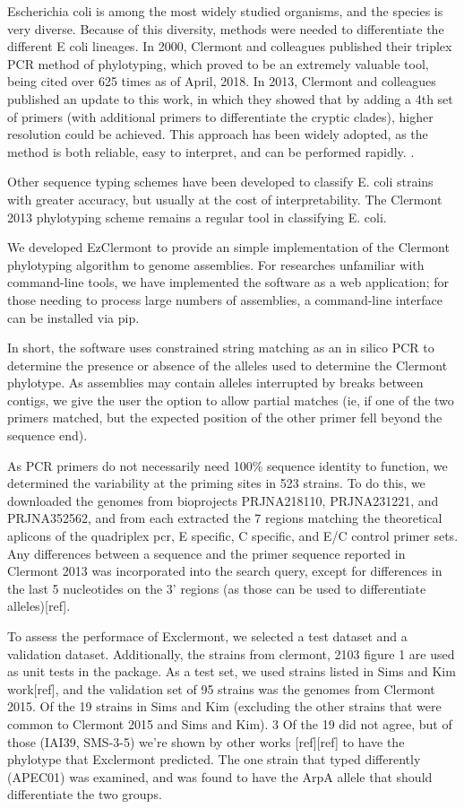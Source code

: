Escherichia coli is among the most widely studied organisms, and the species is very diverse.  Because of this diversity, methods were needed to differentiate the different  E coli lineages.  In 2000, Clermont and colleagues published their triplex PCR method of phylotyping, which proved to be an extremely valuable tool, being cited over 625 times as of April, 2018.  In 2013, Clermont and colleagues published an update to this work, in which they showed that by adding a 4th set of primers (with additional primers to differentiate the cryptic clades), higher resolution could be achieved.  This approach has been widely adopted, as the method is both reliable, easy to interpret, and can be performed rapidly.  .

Other sequence typing schemes have been developed to classify E. coli strains with greater accuracy, but usually at the cost of interpretability. The Clermont 2013 phylotyping scheme remains a regular tool in classifying E. coli.

We developed EzClermont to provide an simple implementation of the Clermont phylotyping algorithm to genome assemblies.  For researches unfamiliar with command-line tools, we have implemented the software as a web application; for those needing to process large numbers of assemblies, a command-line interface can be installed via pip.

In short, the software uses constrained string matching as an in silico PCR to determine the presence or absence of the alleles used to determine the Clermont phylotype. As assemblies may contain alleles interrupted by breaks between contigs, we give the user the option to allow partial matches (ie, if one of the two primers matched, but the expected position of the other primer fell beyond the sequence end).

As PCR primers do not necessarily need 100\% sequence identity to function, we determined the variability at the priming sites in 523 strains. To do this, we downloaded the genomes from bioprojects PRJNA218110, PRJNA231221,  and PRJNA352562, and from each extracted the 7 regions matching the theoretical aplicons of the quadriplex pcr, E specific, C specific, and E/C control primer sets.  Any differences between a sequence and the primer sequence reported in Clermont 2013 was incorporated into the search query, except for differences in the last 5 nucleotides on the 3’ regions (as those can be used to differentiate alleles)[ref].

To assess the performace of Exclermont, we selected a test dataset and a validation dataset.  Additionally, the strains from clermont, 2103 figure 1 are used as unit tests in the package.
As a test set, we used strains listed in Sims and Kim work[ref], and the validation set of 95 strains was the genomes from Clermont 2015.  Of the 19 strains in Sims and Kim (excluding the other strains that were common to Clermont 2015 and Sims and Kim).  3 Of the 19 did not agree, but of those (IAI39, SMS-3-5) we’re shown by other works [ref][ref] to have the phylotype that Exclermont predicted.  The one strain that typed differently (APEC01) was examined, and was found to have the ArpA allele that should differentiate the two groups.


